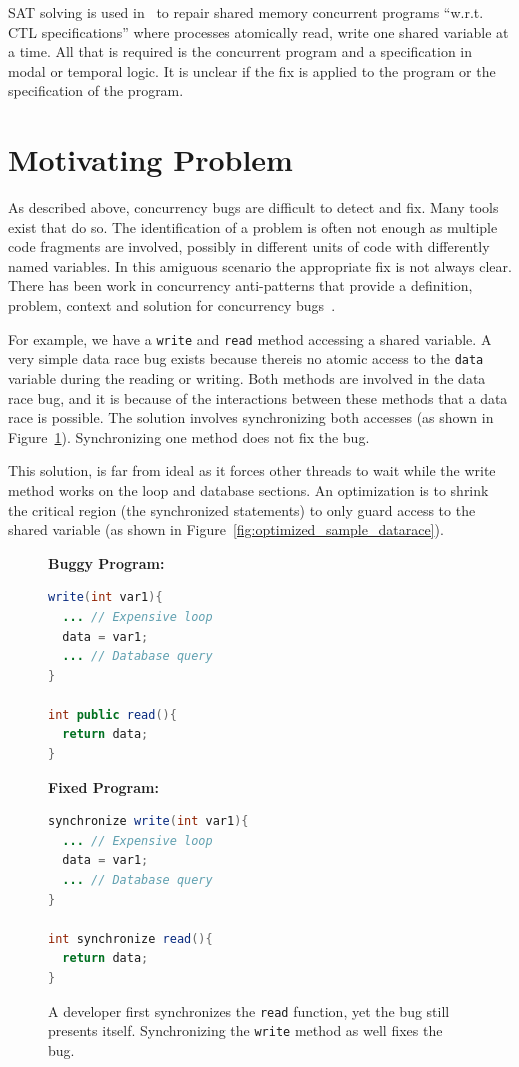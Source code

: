 \documentclass[10pt, conference, compsocconf]{IEEEtran}
\begin{document}
SAT solving is used in~\cite{AY07}  to repair shared memory concurrent programs
``w.r.t. CTL specifications'' where processes atomically read, write one shared
variable at a time. All that is required is the concurrent program and a
specification in modal or temporal logic. It is unclear if the fix is applied
to the program or the specification of the program.

\section{Motivating Problem}
\label{sec:motivation}

As described above, concurrency bugs are difficult to detect and fix. Many
tools exist that do so. The identification of a problem is often not enough as
multiple code fragments are involved, possibly in different units of code with
differently named variables. In this amiguous scenario the appropriate fix is
not always clear. There has been work in concurrency anti-patterns that provide
a definition, problem, context and solution for concurrency bugs~\cite{BJ09}.

For example, we have a \texttt{write} and \texttt{read} method accessing a
shared variable. A very simple data race bug exists because thereis no atomic
access to the \texttt{data} variable during the reading or writing. Both
methods are involved in the data race bug, and it is because of the
interactions between these methods that a data race is possible. The solution
involves synchronizing both accesses (as shown in
Figure~\ref{fig:fixed_sample_datarace}). Synchronizing one method does not fix
the bug.

This solution, is far from ideal as it forces other threads to wait while the
write method works on the loop and database sections. An optimization is to
shrink the critical region (the synchronized statements) to only guard access
to the shared variable (as shown in
Figure~\ref{fig:optimized_sample_datarace}).

\begin{figure}[!h]
\vspace{2mm}
\begin{minipage}{3.70cm}
\footnotesize{\textbf{Buggy Program:}}
\begin{lstlisting}[language=Java]
write(int var1){
  ... // Expensive loop
  data = var1;
  ... // Database query
}

int public read(){
  return data;
}
\end{lstlisting}
\end{minipage}\hfill
\begin{minipage}{3.70cm}
\footnotesize{\textbf{Fixed Program:}}
\begin{lstlisting}[language=Java]
synchronize write(int var1){
  ... // Expensive loop
  data = var1;
  ... // Database query
}

int synchronize read(){
  return data;
}
\end{lstlisting}
\end{minipage}
\caption{A developer first synchronizes the \texttt{read} function, yet the bug
still presents itself. Synchronizing the \texttt{write} method as well fixes
the bug.}
\label{fig:fixed_sample_datarace}
\end{figure}
\end{document}
